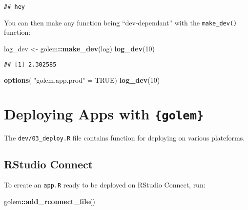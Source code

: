 \documentclass[]{book}
\newenvironment{Shaded}{\begin{snugshade}}{\end{snugshade}}
\newcommand{\DecValTok}[1]{\textcolor[rgb]{0.00,0.00,0.81}{#1}}
\newcommand{\KeywordTok}[1]{\textcolor[rgb]{0.13,0.29,0.53}{\textbf{#1}}}
\newcommand{\NormalTok}[1]{#1}
\newcommand{\OperatorTok}[1]{\textcolor[rgb]{0.81,0.36,0.00}{\textbf{#1}}}
\newcommand{\OtherTok}[1]{\textcolor[rgb]{0.56,0.35,0.01}{#1}}
\newcommand{\StringTok}[1]{\textcolor[rgb]{0.31,0.60,0.02}{#1}}
\begin{document}
\begin{verbatim}
## hey
\end{verbatim}

You can then make any function being ``dev-dependant'' with the \texttt{make\_dev()} function:

\begin{Shaded}
\begin{Highlighting}[]
\NormalTok{log_dev <-}\StringTok{ }\NormalTok{golem}\OperatorTok{::}\KeywordTok{make_dev}\NormalTok{(log)}
\KeywordTok{log_dev}\NormalTok{(}\DecValTok{10}\NormalTok{)}
\end{Highlighting}
\end{Shaded}

\begin{verbatim}
## [1] 2.302585
\end{verbatim}

\begin{Shaded}
\begin{Highlighting}[]
\KeywordTok{options}\NormalTok{( }\StringTok{"golem.app.prod"}\NormalTok{ =}\StringTok{ }\OtherTok{TRUE}\NormalTok{)}
\KeywordTok{log_dev}\NormalTok{(}\DecValTok{10}\NormalTok{)}
\end{Highlighting}
\end{Shaded}

\hypertarget{deploying-apps-with-golem}{%
\section{\texorpdfstring{Deploying Apps with \texttt{\{golem\}}}{Deploying Apps with \{golem\}}}\label{deploying-apps-with-golem}}

The \texttt{dev/03\_deploy.R} file contains function for deploying on various plateforms.

\hypertarget{rstudio-connect}{%
\subsection{RStudio Connect}\label{rstudio-connect}}

To create an \texttt{app.R} ready to be deployed on RStudio Connect, run:

\begin{Shaded}
\begin{Highlighting}[]
\NormalTok{golem}\OperatorTok{::}\KeywordTok{add_rconnect_file}\NormalTok{()}
\end{Highlighting}
\end{Shaded}
\end{document}
